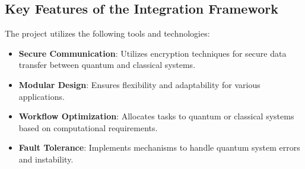 \documentclass[12pt,a4paper]{article}
\begin{document}
\subsection{Key Features of the Integration Framework}
The project utilizes the following tools and technologies:
\begin{itemize}
    \item \textbf{Secure Communication}: Utilizes encryption techniques for secure data transfer between quantum and classical systems.
    \item \textbf{Modular Design}: Ensures flexibility and adaptability for various applications.
    \item \textbf{Workflow Optimization}: Allocates tasks to quantum or classical systems based on computational requirements.
    \item \textbf{Fault Tolerance}: Implements mechanisms to handle quantum system errors and instability.
    
\end{itemize}
\end{document}
